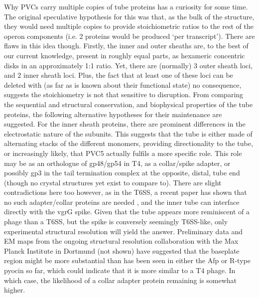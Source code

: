 Why PVCs carry multiple copies of tube proteins has a curiosity for some time. The original speculative hypothesis for this was that, as the bulk of the structure, they would need multiple copies to provide stoichiometric ratios to the rest of the operon components (i.e. 2 proteins would be produced `per transcript'). There are flaws in this idea though. Firstly, the inner and outer sheaths are, to the best of our current knowledge, present in roughly equal parts, as hexameric concentric disks in an approximately 1:1 ratio. Yet, there are (normally) 3 outer sheath loci, and 2 inner sheath loci. Plus, the fact that at least one of these loci can be deleted with (as far as is known about their functional state) no consequence, suggests the stoichiometry is not that sensitive to disruption. From comparing the sequential and structural conservation, and biophysical properties of the tube proteins, the following alternative hypotheses for their maintenance are suggested. For the inner sheath proteins, there are prominent differences in the electrostatic nature of the subunits. This suggests that the tube is either made of alternating stacks of the different monomers, providing directionality to the tube, or increasingly likely, that PVC5 actually fulfils a more specific role. This role may be as an orthologue of gp48/gp54 in T4, as a collar/spike adapter, or possibly gp3 in the tail termination complex at the opposite, distal, tube end (though no crystal structures yet exist to compare to). There are slight contradictions here too however, as in the T6SS, a recent paper has shown that no such adapter/collar proteins are needed \citep{Renault2018}, and the inner tube can interface directly with the vgrG spike. Given that the tube appears more reminiscent of a phage than a T6SS, but the spike is conversely seemingly T6SS-like, only experimental structural resolution will yield the answer. Preliminary data and EM maps from the ongoing structural resolution collaboration with the Max Planck Institute in Dortmund (not shown) have suggested that the baseplate region might be more substantial than has been seen in either the Afp or R-type pyocin so far, which could indicate that it is more similar to a T4 phage. In which case, the likelihood of a collar adapter protein remaining is somewhat higher.

